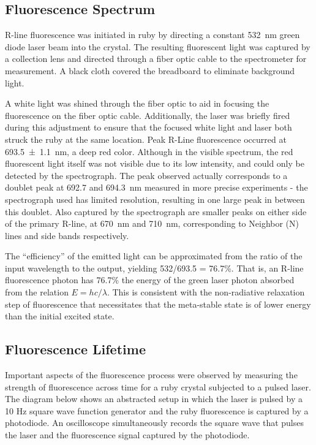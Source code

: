 \documentclass[11pt, a4paper, twocolumn]{article}
\begin{document}
\subsection*{Fluorescence Spectrum}
R-line fluorescence was initiated in ruby by directing a constant \SI{532}{\nm} green diode laser beam into the crystal. The resulting fluorescent light was captured by a collection lens and directed through a fiber optic cable to the spectrometer for measurement. A black cloth covered the breadboard to eliminate background light.

A white light was shined through the fiber optic to aid in focusing the fluorescence on the fiber optic cable. Additionally, the laser was briefly fired during this adjustment to ensure that the focused white light and laser both struck the ruby at the same location.
Peak R-Line fluorescence occurred at \SI{693.5\pm1.1}{\nm}, a deep red color. Although in the visible spectrum, the red fluorescent light itself was not visible due to its low intensity, and could only be detected by the spectrograph. The peak observed actually corresponds to a doublet peak at 692.7 and \SI{694.3}{\nm} measured in more precise experiments -  the spectrograph used has limited resolution, resulting in one large peak in between this doublet. Also captured by the spectrograph are smaller peaks on either side of the primary R-line, at \SI{670}{\nm} and \SI{710}{\nm}, corresponding to Neighbor (N) lines and side bands respectively.

The “efficiency” of the emitted light can be approximated from the ratio of the input wavelength to the output, yielding 532/693.5 = 76.7\%. That is, an R-line fluorescence photon has 76.7\% the energy of the green laser photon absorbed from the relation $E = hc/\lambda$. This is consistent with the non-radiative relaxation step of fluorescence that necessitates that the meta-stable state is of lower energy than the initial excited state.

\subsection*{Fluorescence Lifetime}

Important aspects of the fluorescence process were observed by measuring the strength of fluorescence across time for a ruby crystal subjected to a pulsed laser. The diagram below shows an abstracted setup in which the laser is pulsed by a 10 Hz square wave function generator and the ruby fluorescence is captured by a photodiode. An oscilloscope simultaneously records the square wave that pulses the laser and the fluorescence signal captured by the photodiode.
\end{document}
